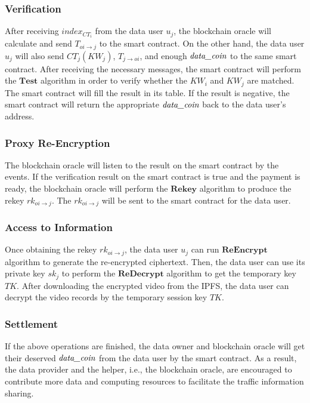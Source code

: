 \documentclass[journal]{IEEEtran}
\begin{document}
    \subsubsection{\textbf{Verification}}
    
    After receiving $index_{CT_i}$ from the data user $u_j$, the blockchain oracle will calculate and send $T_{oi \to j}$ to the smart contract. On the other hand, the data user $u_j$ will also send $CT_j(KW_j)$, $T_{j \to oi}$, and enough $\emph{data\_coin}$ to the same smart contract. After receiving the necessary messages, the smart contract will perform the $\boldsymbol{Test}$ algorithm in order to verify whether the $KW_i$ and $KW_j$ are matched. The smart contract will fill the result in its table. If the result is negative, the smart contract will return the appropriate $\emph{data\_coin}$ back to the data user's address.

    \subsubsection{\textbf{Proxy Re-Encryption}}
    
    The blockchain oracle will listen to the result on the smart contract by the events. If the verification result on the smart contract is true and the payment is ready, the blockchain oracle will perform the $\boldsymbol{Rekey}$ algorithm to produce the rekey $rk_{oi \to j}$. The $rk_{oi \to j}$ will be sent to the smart contract for the data user.

    \subsubsection{\textbf{Access to Information}}

    Once obtaining the rekey $rk_{oi \to j}$, the data user $u_j$ can run $\boldsymbol{ReEncrypt}$ algorithm to generate the re-encrypted ciphertext. Then, the data user can use its private key $sk_j$ to perform the $\boldsymbol{ReDecrypt}$ algorithm to get the temporary key $TK$. After downloading the encrypted video from the IPFS, the data user can decrypt the video records by the temporary session key $TK$.

    \subsubsection{\textbf{Settlement}}

    If the above operations are finished, the data owner and blockchain oracle will get their deserved $\emph{data\_coin}$ from the data user by the smart contract. As a result, the data provider and the helper, i.e., the blockchain oracle, are encouraged to contribute more data and computing resources to facilitate the traffic information sharing.
\end{document}
